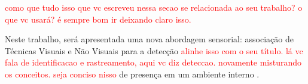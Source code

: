 \textcolor{red}{como que tudo isso que vc escreveu nessa secao se relacionada ao seu trabalho? o que vc usará? é sempre bom ir deixando claro isso.}


 Neste trabalho, será apresentada uma nova abordagem sensorial: associação de Técnicas Visuais e Não Visuais para a detecção \textcolor{red}{alinhe isso com o seu título. lá vc fala de identificacao e rastreamento, aqui vc diz deteccao. novamente misturando os conceitos. seja conciso nisso} de presença em um ambiente interno \cite{yun2014human}.